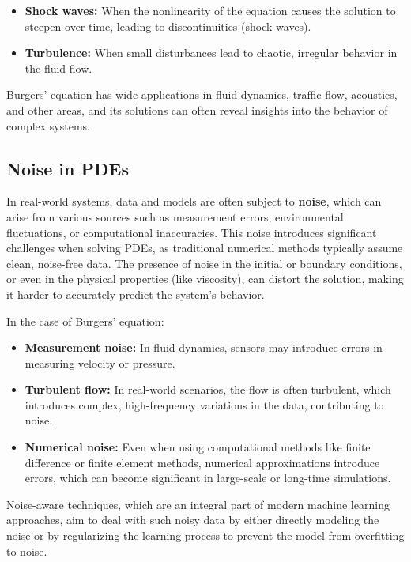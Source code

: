 \documentclass[conference]{IEEEtran}
\begin{document}
\begin{itemize}
    \item \textbf{Shock waves:} When the nonlinearity of the equation causes the solution to steepen over time, leading to discontinuities (shock waves).
    \item \textbf{Turbulence:} When small disturbances lead to chaotic, irregular behavior in the fluid flow.
\end{itemize}

Burgers' equation has wide applications in fluid dynamics, traffic flow, acoustics, and other areas, and its solutions can often reveal insights into the behavior of complex systems.

\subsection{Noise in PDEs}

In real-world systems, data and models are often subject to \textbf{noise}, which can arise from various sources such as measurement errors, environmental fluctuations, or computational inaccuracies. This noise introduces significant challenges when solving PDEs, as traditional numerical methods typically assume clean, noise-free data. The presence of noise in the initial or boundary conditions, or even in the physical properties (like viscosity), can distort the solution, making it harder to accurately predict the system's behavior.

In the case of Burgers' equation:
\begin{itemize}
    \item \textbf{Measurement noise:} In fluid dynamics, sensors may introduce errors in measuring velocity or pressure.
    \item \textbf{Turbulent flow:} In real-world scenarios, the flow is often turbulent, which introduces complex, high-frequency variations in the data, contributing to noise.
    \item \textbf{Numerical noise:} Even when using computational methods like finite difference or finite element methods, numerical approximations introduce errors, which can become significant in large-scale or long-time simulations.
\end{itemize}

Noise-aware techniques, which are an integral part of modern machine learning approaches, aim to deal with such noisy data by either directly modeling the noise or by regularizing the learning process to prevent the model from overfitting to noise.
\end{document}
